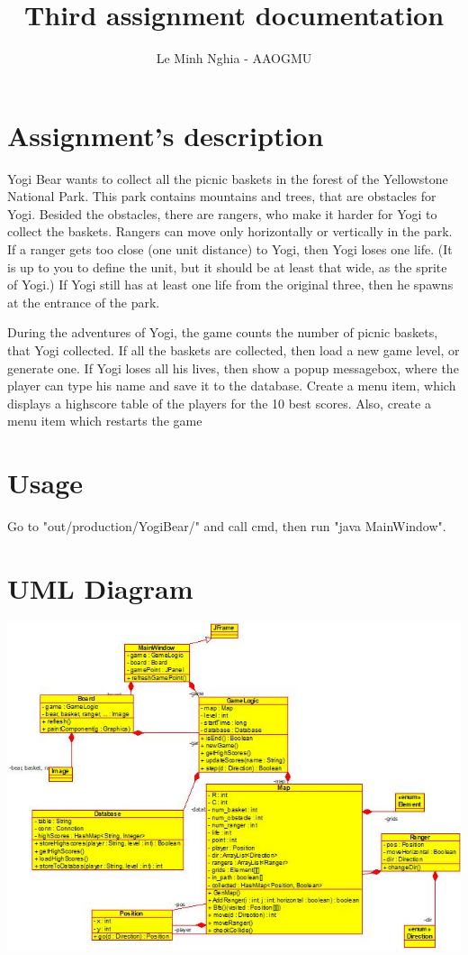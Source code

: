 \documentclass[a4paper, 12pt]{report}
\begin{document}
\title{Third assignment documentation}
\author{Le Minh Nghia - AAOGMU}
\maketitle
{}
\tableofcontents

\chapter{Assignment's description}
	Yogi Bear wants to collect all the picnic baskets in the forest of the Yellowstone National
Park. This park contains mountains and trees, that are obstacles for Yogi. Besided the
obstacles, there are rangers, who make it harder for Yogi to collect the baskets. Rangers
can move only horizontally or vertically in the park. If a ranger gets too close (one unit
distance) to Yogi, then Yogi loses one life. (It is up to you to define the unit, but it should
be at least that wide, as the sprite of Yogi.) If Yogi still has at least one life from the
original three, then he spawns at the entrance of the park.

	During the adventures of Yogi, the game counts the number of picnic baskets, that Yogi
collected. If all the baskets are collected, then load a new game level, or generate one. If
Yogi loses all his lives, then show a popup messagebox, where the player can type his
name and save it to the database. Create a menu item, which displays a highscore table of
the players for the 10 best scores. Also, create a menu item which restarts the game
\chapter{Usage}

Go to "out/production/YogiBear/" and call cmd, then run "java MainWindow".

\chapter{UML Diagram}
\includegraphics[scale=1.0]{class_diagram.jpeg}
\end{document}
